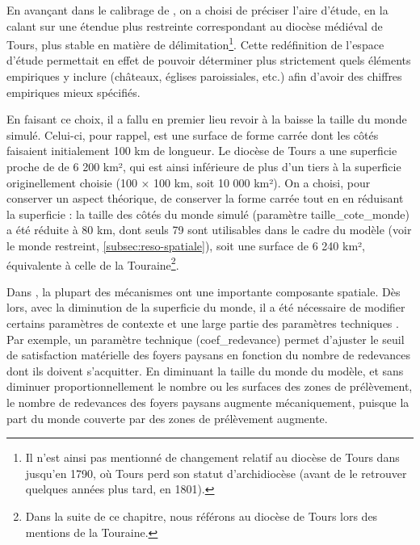 En avançant dans le calibrage de \simfeodal{}, on a choisi de préciser l'aire d'étude, en la calant sur une étendue plus restreinte correspondant au diocèse médiéval de Tours, plus stable en matière de délimitation\footnote{
	Il n'est ainsi pas mentionné de changement relatif au diocèse de Tours dans \textcite[309--326]{mirot1947manuel} jusqu'en 1790, où Tours perd son statut d'archidiocèse (avant de le retrouver quelques années plus tard, en 1801).
}.
Cette redéfinition de l'espace d'étude permettait en effet de pouvoir déterminer plus strictement quels éléments empiriques y inclure (châteaux, églises paroissiales, etc.) afin d'avoir des chiffres empiriques mieux spécifiés.

En faisant ce choix, il a fallu en premier lieu revoir à la baisse la taille du monde simulé.
Celui-ci, pour rappel, est une surface de forme carrée dont les côtés faisaient initialement 100 km de longueur.
Le diocèse de Tours a une superficie proche de de 6 200 km², qui est ainsi inférieure de plus d'un tiers à la superficie originellement choisie (100 × 100 km, soit 10 000 km²).
On a choisi, pour conserver un aspect théorique, de conserver la forme carrée tout en en réduisant la superficie : la taille des côtés du monde simulé (paramètre \textsf{taille\_cote\_monde}) a été réduite à 80 km, dont seuls 79 sont utilisables dans le cadre du modèle (voir le monde restreint, \cref{subsec:reso-spatiale}), soit une surface de 6 240 km², équivalente à celle de la Touraine\footnote{
	Dans la suite de ce chapitre, nous référons au diocèse de Tours lors des mentions de la Touraine.
}.

Dans \simfeodal{}, la plupart des mécanismes ont une importante composante spatiale.
Dès lors, avec la diminution de la superficie du monde, il a été nécessaire de modifier certains paramètres de contexte et une large partie des paramètres techniques .
Par exemple, un paramètre technique (\textsf{coef\_redevance}) permet d'ajuster le seuil de satisfaction matérielle des foyers paysans en fonction du nombre de redevances dont ils doivent s'acquitter.
En diminuant la taille du monde du modèle, et sans diminuer proportionnellement le nombre ou les surfaces des zones de prélèvement, le nombre de redevances des foyers paysans augmente mécaniquement, puisque la part du monde couverte par des zones de prélèvement augmente.

